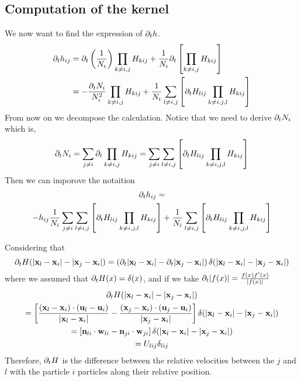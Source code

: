\subsection*{Computation of the kernel }
We now want to find the expression of $\partial_t h$. 
\begin{align*}
    \partial_t h_{ij}
    &= \partial_t \left(
        \frac{1}{N_i}
    \right)
    \prod_{k \neq i,j}  H_{kij}
    + \frac{1}{N_i} \partial_t \left[
        \prod_{k \neq i,j}
        H_{kij} 
    \right] \\
    &= - \frac{\partial_t N_i}{N_i^2}
    \prod_{k \neq i,j}  H_{kij}
    + \frac{1}{N_i} \sum_{l \neq i,j} \left[
        \partial_t H_{lij}
        \prod_{k \neq i,j,l}
        H_{kij} 
    \right] \\
\end{align*}
From now on we decompose the calculation. 
Notice that we need to derive $\partial_t N_i$ which is, 
\begin{equation}
   \partial_t N_i
    = 
    \sum_{j\neq i}
    \partial_t
    \prod_{k \neq i,j}
    H_{kij}\\
    = \sum_{j\neq i}
    \sum_{l \neq i,j} \left[
        \partial_t H_{lij}
        \prod_{k \neq i,j,l}
        H_{kij} 
    \right]
\end{equation}
Then we can imporove the notaition
\begin{multline}
    \partial_t h_{ij}
    = \\
    - h_{ij} \frac{1}{N_i}
    \sum_{j\neq i}
    \sum_{l \neq i,j} \left[
        \partial_t H_{lij}
        \prod_{k \neq i,j,l}
        H_{kij} 
    \right]
    + \frac{1}{N_i} \sum_{l \neq i,j} \left[
        \partial_t H_{lij}
        \prod_{k \neq i,j,l}
        H_{kij} 
    \right] 
\end{multline}

Considering that 
\begin{equation*}
    \partial_t H(|\textbf{x}_l - \textbf{x}_i| - |\textbf{x}_j - \textbf{x}_i|)
    = \left(
        \partial_t|\textbf{x}_l - \textbf{x}_i| - \partial_t|\textbf{x}_j - \textbf{x}_i|
    \right)
    \delta(|\textbf{x}_l - \textbf{x}_i| - |\textbf{x}_j - \textbf{x}_i|)
\end{equation*}
where we assumed that $\partial_t H(x) = \delta(x)$, and if we take $\partial_t |f(x)| = \frac{f(x) f'(x)}{|f(x)|}$
\begin{multline*}
    \partial_t H(|\textbf{x}_l - \textbf{x}_i| - |\textbf{x}_j - \textbf{x}_i|)
    \\= 
    \left[
    \frac{(\textbf{x}_l - \textbf{x}_i) \cdot (\textbf{u}_l - \textbf{u}_i)}{|\textbf{x}_l - \textbf{x}_i|}
    - 
    \frac{(\textbf{x}_j - \textbf{x}_i) \cdot(\textbf{u}_j - \textbf{u}_i)}{|\textbf{x}_j - \textbf{x}_i|}
    \right]\delta(|\textbf{x}_l - \textbf{x}_i| - |\textbf{x}_j - \textbf{x}_i|)
    \\= 
    \left[
    \textbf{n}_{li}\cdot \textbf{w}_{li}
    - 
    \textbf{n}_{ji}\cdot\textbf{w}_{ji}
    \right]\delta(|\textbf{x}_l - \textbf{x}_i| - |\textbf{x}_j - \textbf{x}_i|)
    \\= U_{lij}\delta_{lij}
\end{multline*}
Therefore, $\partial_t H$ is the difference between the relative velocities between the $j$ and $l$ with the particle $i$ particles along their relative position. 

